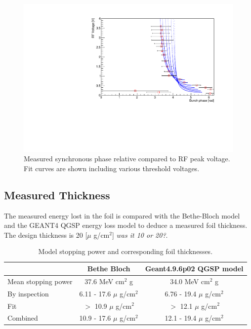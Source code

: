 \documentclass{paper}
\begin{document}
\begin{figure}
		\includegraphics[width=1.0\textwidth]{images/synchronous_phase_vs_voltage}
	\caption{Measured synchronous phase relative compared to RF peak voltage. Fit
           curves are shown including various threshold voltages.}
	\label{fig:rf_phase_to_voltage}
\end{figure}

\subsection{Measured Thickness}
The measured energy lost in the foil is compared with the Bethe-Bloch model 
\cite{PDG} and the GEANT4 QGSP energy loss model \cite{GEANT4} to deduce a 
measured foil thickness. The design thickness is 20 [$\mu$ g/cm$^2$] \emph{was it 10 or 20?}.

\begin{table}
\begin{center}
\begin{tabular}[\linewidth]{l|cc}
               & Bethe Bloch   & Geant4.9.6p02 QGSP model \\
\hline
Mean stopping power & 37.6 MeV cm$^2$ g          & 34.0 MeV cm$^2$ g   \\
\hline
By inspection       & 6.11 - 17.6 $\mu$ g/cm$^2$ & 6.76 - 19.4 $\mu$ g/cm$^2$ \\
Fit                 & $>$ 10.9 $\mu$ g/cm$^2$    &  $>$ 12.1 $\mu$ g/cm$^2$ \\
Combined            & 10.9 - 17.6 $\mu$ g/cm$^2$ &  12.1 - 19.4 $\mu$ g/cm$^2$ \\
\end{tabular}
\caption{Model stopping power and corresponding foil thicknesses.}
\end{center}
\end{table}
\end{document}
